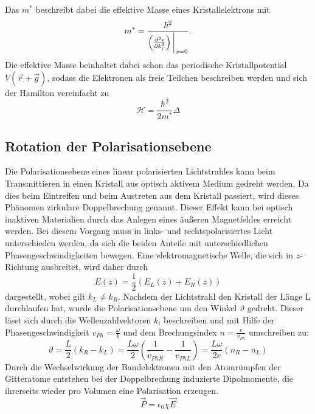 Das $m^*$ beschreibt dabei die effektive Masse eines Kristallelektrons mit
\begin{equation}
m^* = \frac{\hbar^2}{\left(\frac{\partial^2 \epsilon}{\partial k_i^2}\right)\bigg{\vert}_{x=0}}.
\end{equation}
Die effektive Masse beinhaltet dabei schon das periodische Kristallpotential $V(\vec{r}+\vec{g})$, sodass die Elektronen als
freie Teilchen beschreiben werden und sich der Hamilton vereinfacht zu
\begin{equation*}
  \mathscr{H} = \frac{\hbar^2}{2m^*}\Delta
\end{equation*}

\subsection{Rotation der Polarisationsebene}
Die Polarisationsebene eines linear polarisierten Lichtstrahles kann beim Transmittieren in einen Kristall aus optisch aktivem Medium gedreht
werden. Da dies beim Eintreffen und beim Austreten aus dem Kristall passiert, wird dieses Phänomen zirkulare Doppelbrechung genannt. Dieser
Effekt kann bei optisch inaktiven Materialien durch das Anlegen eines äußeren Magnetfeldes erreicht werden.
Bei diesem Vorgang muss in links- und rechtspolarisiertes Licht unterschieden werden, da sich die beiden Anteile mit unterschiedlichen
Phasengeschwindigkeiten bewegen. Eine elektromagnetische Welle, die sich in $z$-Richtung ausbreitet, wird daher durch
\begin{equation}
  E(z) = \frac{1}{2}(E_L(z) + E_R(z))
\end{equation}
dargestellt, wobei gilt $k_L \neq k_R$.
Nachdem der Lichtstrahl den Kristall der Länge L durchlaufen hat, wurde die Polarisationsebene um den Winkel $\vartheta$ gedreht. Dieser
lässt sich durch die Wellenzahlvektoren $k_i$ beschreiben und mit Hilfe der Phasengeschwindigkeit $v_{Ph} = \frac{\omega}{k}$ und dem Brechungsindex
$n = \frac{c}{v_{Ph}}$ umschreiben zu:
\begin{equation}
  \vartheta = \frac{L}{2}(k_R - k_L) = \frac{L\omega}{2}(\frac{1}{v_{PhR}} - \frac{1}{v_{PhL}}) = \frac{L\omega}{2c}(n_R - n_L)
\end{equation}
Durch die Wechselwirkung der Bandelektronen mit den Atomrümpfen der Gitteratome entstehen bei der Doppelbrechung induzierte Dipolmomente,
die ihrerseits wieder pro Volumen eine Polarisation erzeugen.
\begin{equation}
  \vec{P} = \epsilon_0\chi\vec{E}
\end{equation}
